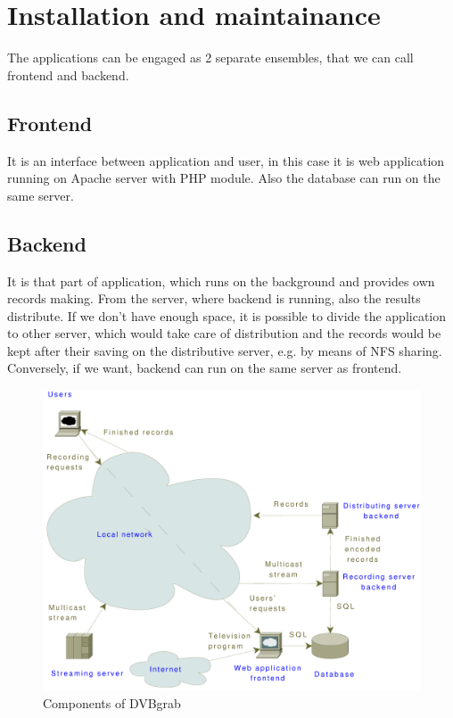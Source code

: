 \chapter{Installation and maintainance}
The applications can be engaged as 2 separate ensembles, that we can call frontend and backend.
\section{Frontend}
It is an interface between application and user, in this case it is web application running on Apache server with PHP module. Also the database can run on the same server.
\section{Backend}
It is that part of application, which runs on the background and provides own records making. From the server, where backend is running, also the results distribute. If we don't have enough space, it is possible to divide the application to other server, which would take care of distribution and the records would be kept after their saving on the distributive server, e.g. by means of NFS sharing. Conversely, if we want, backend can run on the same server as frontend.

\begin{figure}[ht]
\begin{center}
\includegraphics[width=15cm]{images/dvbgrab}
\caption{Components of DVBgrab}
\label{fig:dvbgrab}
\end{center}
\end{figure}

